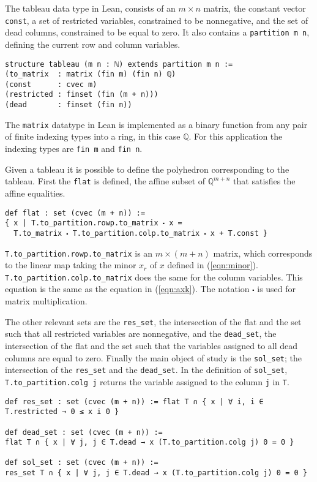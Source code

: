 \documentclass[11pt]{article} %
\begin{document}
The tableau data type in Lean, consists of an $m \times n$ matrix, the constant vector \verb|const|, a set of restricted variables, constrained to be nonnegative, and the set of dead columns, constrained to be equal to zero. It also contains a \verb|partition m n|, defining the current row and column variables.

\begin{lstlisting}
structure tableau (m n : ℕ) extends partition m n :=
(to_matrix  : matrix (fin m) (fin n) ℚ)
(const      : cvec m)
(restricted : finset (fin (m + n)))
(dead       : finset (fin n))
\end{lstlisting}

The \verb|matrix| datatype in Lean is implemented as a binary function from any pair of finite indexing types into a ring, in this case $\mathbb{Q}$. For this application the indexing types are \verb|fin m| and \verb|fin n|.

Given a tableau it is possible to define the polyhedron corresponding to the tableau. First the \verb|flat| is defined, the affine subset of $\mathbb{Q}^{m + n}$ that satisfies the affine equalities.

\begin{lstlisting}
def flat : set (cvec (m + n)) :=
{ x | T.to_partition.rowp.to_matrix ⬝ x =
  T.to_matrix ⬝ T.to_partition.colp.to_matrix ⬝ x + T.const }
\end{lstlisting}

\verb|T.to_partition.rowp.to_matrix| is an $m \times (m + n)$ matrix, which corresponds to the linear map taking the minor $x_r$ of $x$ defined in (\ref{eqn:minor}). \verb|T.to_partition.colp.to_matrix| does the same for the column variables. This equation is the same as the equation in (\ref{eqn:axk}). The notation \lstinline|⬝| is used for matrix multiplication.

The other relevant sets are the \verb|res_set|, the intersection of the flat and the set such that all restricted variables are nonnegative, and the \verb|dead_set|, the intersection of the flat and the set such that the variables assigned to all dead columns are equal to zero. Finally the main object of study is the \verb|sol_set|; the intersection of the \verb|res_set| and the \verb|dead_set|. In the definition of \lstinline|sol_set|, \lstinline|T.to_partition.colg j| returns the variable assigned to the column \lstinline |j| in \lstinline|T|.

\begin{lstlisting}
def res_set : set (cvec (m + n)) := flat T ∩ { x | ∀ i, i ∈ T.restricted → 0 ≤ x i 0 }

def dead_set : set (cvec (m + n)) :=
flat T ∩ { x | ∀ j, j ∈ T.dead → x (T.to_partition.colg j) 0 = 0 }

def sol_set : set (cvec (m + n)) :=
res_set T ∩ { x | ∀ j, j ∈ T.dead → x (T.to_partition.colg j) 0 = 0 }
\end{lstlisting}
\end{document}
